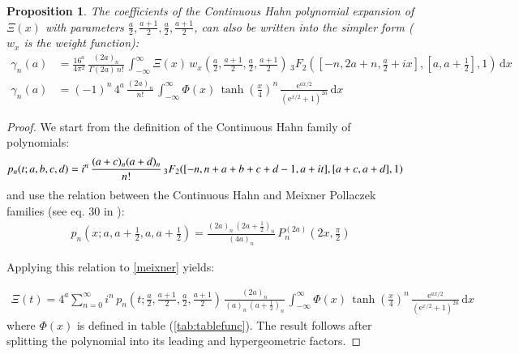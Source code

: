 \documentclass[a4paper,11pt,twoside]{amsart}
\newtheorem{proposition}[theorem]{Proposition}
\newcommand{\verifiedeq}{=}
\newcommand{\defeq}{=}
\newcommand{\verifiedeq}{\stackrel{\checkmark}{=}}
\newcommand{\defeq}{\stackrel{\scriptscriptstyle \textnormal{def}}{=}}
\begin{document}
\begin{proposition}
The coefficients of the Continuous Hahn polynomial expansion of $\Xi(x)$ with parameters $\frac{a}{2}, \frac{a+1}{2},\frac{a}{2},\frac{a+1}{2}$, can also be written into the simpler form ($w_x$ is the weight function): 
\begin{align}
\gamma_n(a) &\verifiedeq \frac{16^a}{4\pi^2}\,\frac{(2a)_n}{\Gamma(2a)\,n!}\,\int_{-\infty}^{\infty} \Xi(x)\,w_x\left(\frac{a}{2},\frac{a+1}{2},\frac{a}{2},\frac{a+1}{2}\right)\,{}_3F_2\left(\left[-n,2a+n,\frac{a}{2}+ix\right],\left[a,a+\frac12\right],1\right)\,\mathrm{d}x \\
\gamma_n(a) &\verifiedeq (-1)^n\,4^a\,\frac{(2a)_n}{n!}\,\int_{-\infty}^{\infty} \Phi(x)\,\tanh\left(\frac{x}{4}\right)^{n}\,\frac{\mathrm{e}^{ax/2}}{\left(\mathrm{e}^{x/2}+1\right)^{2a}}\,\mathrm{d}x
\end{align}
\end{proposition}
\begin{proof}
We start from the definition of the Continuous Hahn family of polynomials:
\begin{align}
 p_n(t;a,b,c,d) &\defeq i^n\,\frac{(a+c)_n(a+d)_n}{n!}\, {}_3F_2([-n, n+ a+b+c+d-1,a+it], [a+c, a+d], 1) \notag
\end{align}
and use the relation between the Continuous Hahn and Meixner Pollaczek families (see eq. 30 in \cite{koesup}):
\begin{align}
 p_n\left(x;a,a+\frac12,a,a+\frac12\right) \verifiedeq \frac{(2a)_n\,\left(2a+\frac12\right)_n}{(4a)_n}\, P_n^{(2a)}\left(2x,\frac{\pi}{2}\right)
\end{align}

Applying this relation to \ref{meixner} yields:

\begin{align}
 \Xi(t)\verifiedeq 4^a \sum_{n=0}^\infty i^n\,p_n\left(t;\frac{a}{2},\frac{a+1}{2},\frac{a}{2},\frac{a+1}{2}\right)\,\frac{(2a)_n}{(a)_n\,\left(a+\frac12\right)_n}\,\int_{-\infty}^\infty \Phi(x)\,\tanh\left(\frac{x}{4}\right)^n\,\frac{\textrm{e}^{ax/2}}{(\textrm{e}^{x/2}+1)^{2a}}\, \mathrm{d}x
\end{align}
where $\Phi(x)$ is defined in table (\ref{tab:tablefunc}). The result follows after splitting the polynomial into its leading and hypergeometric factors.
\end{proof}
\end{document}
